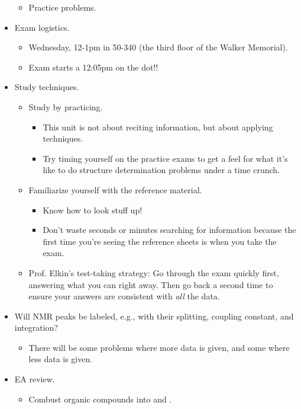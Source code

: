 \documentclass[../notes.tex]{subfiles}
\begin{document}
\begin{itemize}
\begin{itemize}
        \item Practice problems.
    \end{itemize}
    \pagebreak
    \item Exam logistics.
    \begin{itemize}
        \item Wednesday, 12-1pm in 50-340 (the third floor of the Walker Memorial).
        \item Exam starts a 12:05pm on the dot!!
    \end{itemize}
    \item Study techniques.
    \begin{itemize}
        \item Study by practicing.
        \begin{itemize}
            \item This unit is not about reciting information, but about applying techniques.
            \item Try timing yourself on the practice exams to get a feel for what it's like to do structure determination problems under a time crunch.
        \end{itemize}
        \item Familiarize yourself with the reference material.
        \begin{itemize}
            \item Know how to look stuff up!
            \item Don't waste seconds or minutes searching for information because the first time you're seeing the reference sheets is when you take the exam.
        \end{itemize}
        \item Prof. Elkin's test-taking strategy: Go through the exam quickly first, answering what you can right away. Then go back a second time to ensure your answers are consistent with \emph{all} the data.
    \end{itemize}
    \item Will  NMR peaks be labeled, e.g., with their splitting, coupling constant, and integration?
    \begin{itemize}
        \item There will be some problems where more data is given, and some where less data is given.
    \end{itemize}
    \item EA review.
    \begin{itemize}
        \item Combust organic compounds into  and .

\end{itemize}
\end{itemize}
\end{document}
